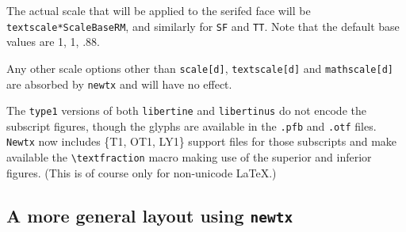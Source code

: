 \documentclass[\fsc]{article}
\theoremstyle{oldplain}
\theoremstyle{plain}
\begin{document}
The actual scale that will be applied to the serifed face will be {\tt textscale*ScaleBaseRM}, and similarly for {\tt SF} and {\tt TT}. Note that the default base values are 1, 1, .88.

Any other scale options other than {\tt  scale[d]}, {\tt textscale[d]} and {\tt mathscale[d]} are absorbed by {\tt newtx} and will have no effect.

%

The {\tt type1} versions of both {\tt libertine} and {\tt libertinus} do not encode the subscript figures, though the glyphs are available in the {\tt.pfb} and {\tt.otf} files. {\tt Newtx} now includes \{T1, OT1, LY1\} support files for those subscripts and make available the \verb|\textfraction| macro making use of the superior and inferior figures. (This is of course only for non-unicode LaTeX.)

\subsection{A more general layout using {\tt newtx}}
\end{document}
